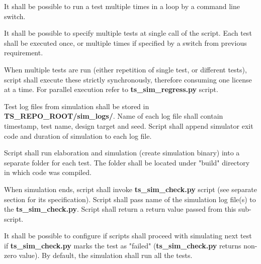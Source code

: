 \documentclass{tropic_design_spec}
\begin{document}
    {It shall be possible to run a test multiple times in a loop by a command line switch.}


    {It shall be possible to specify multiple tests at single call of the script. Each
     test shall be executed once, or multiple times if specified by a switch from previous
     requirement.}


    {When multiple tests are run (either repetition of single test, or different tests),
     script shall execute these strictly synchronously, therefore consuming one license
     at a time. For parallel execution refer to \textbf{ts_sim_regress.py} script.}


    {Test log files from simulation shall be stored in \textbf{TS_REPO_ROOT/sim_logs/}.
     Name of each log file shall contain timestamp, test name, design target and seed.
     Script shall append simulator exit code and duration of simulation to each log file.}


    {Script shall run elaboration and simulation (create simulation binary) into a separate
     folder for each test. The folder shall be located under "build" directory in which
     code was compiled.}


    {When simulation ends, script shall invoke \textbf{ts_sim_check.py} script (see
     separate section for its specification). Script shall pass name of the simulation
     log file(s) to the \textbf{ts_sim_check.py}. Script shall return a return value passed
     from this sub-script.}


    {It shall be possible to configure if scripts shall proceed with simulating next test
     if \textbf{ts_sim_check.py} marks the test as "failed" (\textbf{ts_sim_check.py}
     returns non-zero value). By default, the simulation shall run all the tests.}
\end{document}
